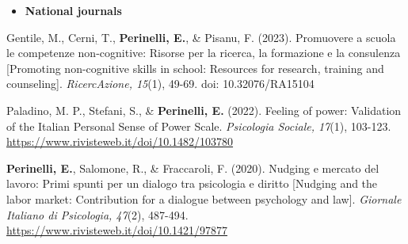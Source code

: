 \documentclass[hidelinks, letterpaper,10pt]{article} %
\begin{document}
\begin{itemize}
	\setlength{\topsep}{0pt}%
	\setlength{\leftmargin}{0.1in}%
	\setlength{\listparindent}{-0.1in}%
	\setlength{\itemindent}{-0.2in}%
	\setlength{\parsep}{\parskip}%
	
	\item {\textbf{\large{National journals}}}
\end{itemize}
\begin{etaremune}
	\item Gentile, M., Cerni, T., \textbf{Perinelli, E.}, \& Pisanu, F. (2023). Promuovere a scuola le competenze non-cognitive: Risorse per la ricerca, la formazione e la consulenza [Promoting non-cognitive skills in school: Resources for research, training and counseling]. \textit{RicercAzione, 15}(1), 49-69. doi: 10.32076/RA15104

	\item Paladino, M. P., Stefani, S., \& \textbf{Perinelli, E.} (2022). Feeling of power: Validation of the Italian Personal Sense of Power Scale. \textit{Psicologia Sociale, 17}(1), 103-123. \url{https://www.rivisteweb.it/doi/10.1482/103780}

	\item \textbf{Perinelli, E.}, Salomone, R., \& Fraccaroli, F. (2020). Nudging e mercato del lavoro: Primi spunti per un dialogo tra psicologia e diritto [Nudging and the labor market: Contribution for a dialogue between psychology and law]. \textit{Giornale Italiano di Psicologia, 47}(2), 487-494. \url{https://www.rivisteweb.it/doi/10.1421/97877}
\end{etaremune}
\vspace{3mm}
\end{document}
